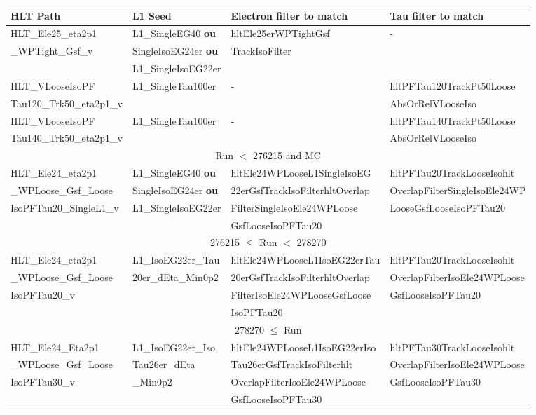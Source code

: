 {\footnotesize
\begin{tabularx}{\textwidth}{llXX}
\toprule
HLT Path & L1 Seed & Electron filter to match & Tau filter to match \\
\hline
HLT\_Ele25\_eta2p1
&
L1\_SingleEG40 \textbf{ou}
&
hltEle25erWPTightGsf
&
-
\\
\_WPTight\_Gsf\_v
&
SingleIsoEG24er \textbf{ou}
&
TrackIsoFilter
\\
&
L1\_SingleIsoEG22er
\\\hline
HLT\_VLooseIsoPF
&
L1\_SingleTau100er
&
-
&
hltPFTau120TrackPt50Loose
\\
Tau120\_Trk50\_eta2p1\_v\!
&
&
&
AbsOrRelVLooseIso
\\\hline
HLT\_VLooseIsoPF
&
L1\_SingleTau100er
&
-
&
hltPFTau140TrackPt50Loose
\\
Tau140\_Trk50\_eta2p1\_v\!
&
&
&
AbsOrRelVLooseIso
\\
\midrule
\multicolumn{4}{c}{Run $<$ 276215 and MC}
\\\hline
HLT\_Ele24\_eta2p1
&
L1\_SingleEG40 \textbf{ou}
&
hltEle24WPLooseL1SingleIsoEG
&
hltPFTau20TrackLooseIsohlt
\\
\_WPLoose\_Gsf\_Loose
&
SingleIsoEG24er \textbf{ou}
&
22erGsfTrackIsoFilterhltOverlap
&
OverlapFilterSingleIsoEle24WP
\\
IsoPFTau20\_SingleL1\_v\!
&
L1\_SingleIsoEG22er
&
FilterSingleIsoEle24WPLoose
&
LooseGsfLooseIsoPFTau20
\\
&
&
GsfLooseIsoPFTau20
\\
\midrule
\multicolumn{4}{c}{276215 $\leq$ Run $<$ 278270}
\\\hline
HLT\_Ele24\_eta2p1
&
L1\_IsoEG22er\_Tau
&
hltEle24WPLooseL1IsoEG22erTau\!
&
hltPFTau20TrackLooseIsohlt
\\
\_WPLoose\_Gsf\_Loose
&
20er\_dEta\_Min0p2
&
20erGsfTrackIsoFilterhltOverlap
&
OverlapFilterIsoEle24WPLoose
\\
IsoPFTau20\_v
&
&
FilterIsoEle24WPLooseGsfLoose
&
GsfLooseIsoPFTau20
\\
&
&
IsoPFTau20
\\
\midrule
\multicolumn{4}{c}{278270 $\leq$ Run}
\\\hline
HLT\_Ele24\_Eta2p1
&
L1\_IsoEG22er\_Iso
&
hltEle24WPLooseL1IsoEG22erIso
&
hltPFTau30TrackLooseIsohlt
\\
\_WPLoose\_Gsf\_Loose
&
Tau26er\_dEta
&
Tau26erGsfTrackIsoFilterhlt
&
OverlapFilterIsoEle24WPLoose
\\
IsoPFTau30\_v
&
\_Min0p2
&
OverlapFilterIsoEle24WPLoose
&
GsfLooseIsoPFTau30
\\
&
&
GsfLooseIsoPFTau30
\\
\bottomrule
\end{tabularx}
}